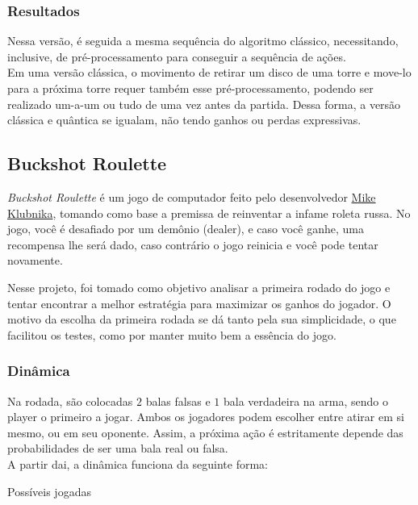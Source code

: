 \documentclass{article}
\begin{document}
\subsubsection{Resultados}

Nessa versão, é seguida a mesma sequência do algoritmo clássico, necessitando, inclusive, de pré-processamento para conseguir a sequência de ações.\\
Em uma versão clássica, o movimento de retirar um disco de uma torre e move-lo para a próxima torre requer também esse pré-processamento, podendo ser realizado um-a-um ou tudo de uma vez antes da partida. Dessa forma, a versão clássica e quântica se igualam, não tendo ganhos ou perdas expressivas. 

\subsection{Buckshot Roulette} \label{buckshot}

\emph{Buckshot Roulette} é um jogo de computador feito pelo desenvolvedor \href{https://mikeklubnika.itch.io/}{Mike Klubnika}, tomando como base a premissa de reinventar a infame roleta russa. No jogo, você é desafiado por um demônio (dealer), e caso você ganhe, uma recompensa lhe será dado, caso contrário o jogo reinicia e você pode tentar novamente.

Nesse projeto, foi tomado como objetivo analisar a primeira rodado do jogo e tentar encontrar a melhor estratégia para maximizar os ganhos do jogador. O motivo da escolha da primeira rodada se dá tanto pela sua simplicidade, o que facilitou os testes, como por manter muito bem a essência do jogo.

\subsubsection{Dinâmica}

Na rodada, são colocadas $2$ balas falsas e $1$ bala verdadeira na arma, sendo o player o primeiro a jogar. Ambos os jogadores podem escolher entre atirar em si mesmo, ou em seu oponente. Assim, a próxima ação é estritamente depende das probabilidades de ser uma bala real ou falsa. \\
A partir dai, a dinâmica funciona da seguinte forma: 

\begin{algorithm}[H]
	\begin{algorithmic}
			\Else
			\EndIf
		\Else
			\Else
			\EndIf
		\EndIf

	\end{algorithmic}
	\caption{Possíveis jogadas}
	\label{alg:buckshot-roulette}
\end{algorithm}
\end{document}
